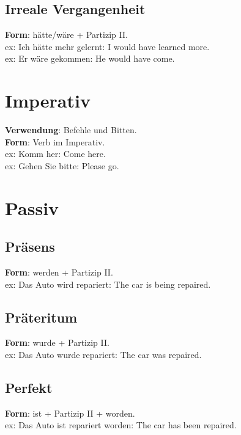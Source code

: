 \documentclass[a4paper]{article}
\begin{document}
        \subsection{Irreale Vergangenheit}
            \textbf{Form}: hätte/wäre + Partizip II.\\
            ex: Ich hätte mehr gelernt: I would have learned more.\\
            ex: Er wäre gekommen: He would have come.\\
    
    
    \section{Imperativ}
        \textbf{Verwendung}: Befehle und Bitten.\\
        \textbf{Form}: Verb im Imperativ.\\
        ex: Komm her: Come here.\\
        ex: Gehen Sie bitte: Please go.\\
    
    
    \section{Passiv}
        
        \subsection{Präsens}
            \textbf{Form}: werden + Partizip II.\\
            ex: Das Auto wird repariert: The car is being repaired.\\
        
        \subsection{Präteritum}
            \textbf{Form}: wurde + Partizip II.\\
            ex: Das Auto wurde repariert: The car was repaired.\\
        
        \subsection{Perfekt}
            \textbf{Form}: ist + Partizip II + worden.\\
            ex: Das Auto ist repariert worden: The car has been repaired.\\
        
\end{document}
